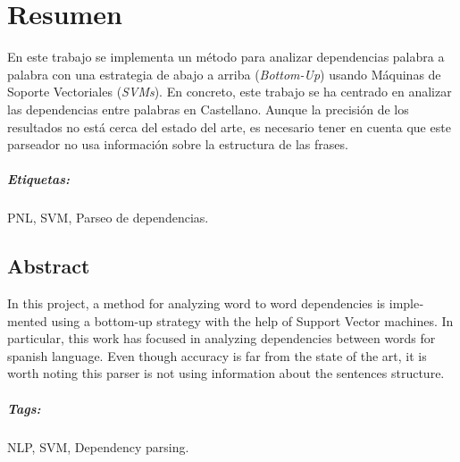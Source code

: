\begingroup
\let\clearpage\relax
\let\cleardoublepage\relax
\let\cleardoublepage\relax


\chapter*{Resumen}
En este trabajo se implementa un método para analizar dependencias
palabra a palabra con una estrategia de abajo a arriba
(\textit{Bottom-Up}) usando Máquinas de Soporte Vectoriales
(\textit{SVMs}). En concreto, este trabajo se ha centrado en analizar
las dependencias entre palabras en Castellano. Aunque la precisión de
los resultados no está cerca del estado del arte, es necesario tener
en cuenta que este parseador no usa información sobre la estructura de
las frases.

\paragraph{Etiquetas:} PNL, SVM, Parseo de dependencias.

\vfill

\begin{otherlanguage}{american}
  \chapter*{Abstract}
  In this project, a method for analyzing word to word dependencies is
  implemented using a bottom-up strategy with the help of Support Vector
  machines. In particular, this work has focused in analyzing
  dependencies between words for spanish language. Even though accuracy
  is far from the state of the art, it is worth noting this parser is
  not using information about the sentences structure.
  \paragraph{Tags:} NLP, SVM, Dependency parsing.
\end{otherlanguage}

\endgroup			

\vfill